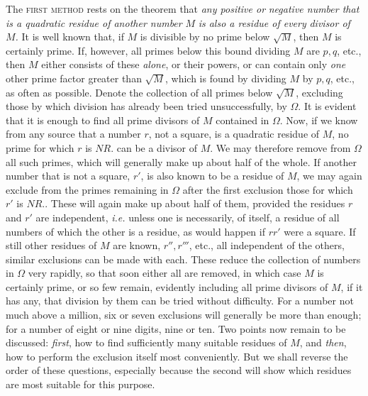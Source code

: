 The \textsc{first method} rests on the theorem that \textit{any positive or} \textit{negative number that is a quadratic residue of another number} \(M\) \textit{is also a residue of every} \textit{divisor of} \(M\)\textit{.} It is well known that, if \(M\) is divisible by no prime below \(\surd M\), then \(M\) is certainly prime. If, however, all primes below this bound dividing \(M\) are \(p,\allowbreak q\), etc., then \(M\) either consists of these \textit{alone}, or their powers, or can contain only \textit{one} other prime factor greater than \(\surd M\), which is found by dividing \(M\) by \(p,\allowbreak q\), etc., as often as possible. Denote the collection of all primes below \(\surd M\), excluding those by which division has already been tried unsuccessfully, by \(\Omega\). It is evident
that it is enough to find all prime divisors of \(M\) contained in \(\Omega\). Now, if we know from any source that a number \(r\), not a square, is a quadratic residue of \(M\), no prime for which \(r\) is \(NR.\) can be a divisor of \(M\). We may therefore remove from \(\Omega\) all such primes, which will generally make up about half of the whole. If another number that is not a square, \(r'\), is also known to be a residue of \(M\), we may again exclude from the primes remaining in \(\Omega\) after the first exclusion those for which \(r'\) is \(NR.\). These will again make up about half of them, provided the residues \(r\) and \(r'\) are independent, \textit{i.e.} unless one is necessarily, of itself, a residue of all numbers of which the other is a residue, as would happen if \(rr'\) were a square. If still other residues of \(M\) are known, \(r'',\allowbreak r'''\), etc., all independent of the others, similar exclusions can be made with each. These reduce the collection of numbers in \(\Omega\) very rapidly, so that soon either all are removed, in which case \(M\) is certainly prime, or so few remain, evidently including all prime divisors of \(M\), if it has any, that division by them can be tried without difficulty. For a number not much above a million, six or seven exclusions will generally be more than enough; for a number of eight or nine digits, nine or ten. Two points now remain to be discussed: \textit{first}, how to find sufficiently many suitable residues of \(M\), and \textit{then}, how to perform the exclusion itself most conveniently. But we shall reverse the order of these questions, especially because the second will show which residues are most suitable for this purpose.
